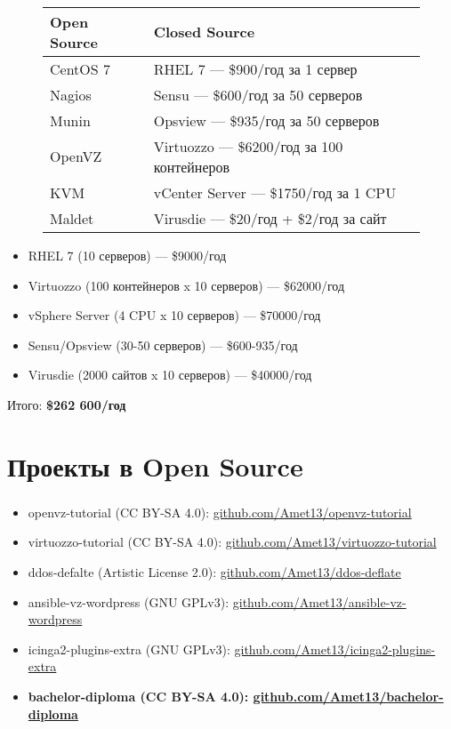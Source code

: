 \begin{frame}
\frametitle{\insertsection}
\begin{figure}[h]
	\begin{tabular}{|l|l|}
		\hline
		\bf{Open Source} & \bf{Closed Source} \\ \hline
		CentOS 7 & RHEL 7 --- \$900/год за 1 сервер \\ \hline
		Nagios & Sensu --- \$600/год за 50 серверов \\
		Munin & Opsview --- \$935/год за 50 серверов \\ \hline
		OpenVZ & Virtuozzo --- \$6200/год за 100 контейнеров \\
		KVM & vCenter Server --- \$1750/год за 1 CPU \\ \hline
		Maldet & Virusdie --- \$20/год + \$2/год за сайт \\ \hline
	\end{tabular}
\end{figure}
\begin{itemize}
	\item RHEL 7 (10 серверов) --- \$9000/год
	\item Virtuozzo (100 контейнеров x 10 серверов) --- \$62000/год
	\item vSphere Server (4 CPU x 10 серверов) --- \$70000/год
	\item Sensu/Opsview (30-50 серверов) --- \$600-935/год
	\item Virusdie (2000 сайтов x 10 серверов) --- \$40000/год
\end{itemize}
Итого: \bf{\$262 600/год}
\end{frame}


\section{Проекты в Open Source}

\begin{frame}
\frametitle{\insertsection}
\begin{itemize}
	\item openvz-tutorial (CC BY-SA 4.0): \href{https://github.com/Amet13/openvz-tutorial}{github.com/Amet13/openvz-tutorial}
	\item virtuozzo-tutorial (CC BY-SA 4.0): \href{https://github.com/Amet13/virtuozzo-tutorial}{github.com/Amet13/virtuozzo-tutorial}
	\item ddos-defalte (Artistic License 2.0): \href{https://github.com/Amet13/ddos-deflate}{github.com/Amet13/ddos-deflate}
	\item ansible-vz-wordpress (GNU GPLv3): \href{https://github.com/Amet13/ansible-vz-wordpress}{github.com/Amet13/ansible-vz-wordpress}
	\item icinga2-plugins-extra (GNU GPLv3): \href{https://github.com/Amet13/icinga2-plugins-extra}{github.com/Amet13/icinga2-plugins-extra}
	\item \bf{bachelor-diploma (CC BY-SA 4.0)}: \href{https://github.com/Amet13/bachelor-diploma}{github.com/Amet13/bachelor-diploma}
\end{itemize}
\end{frame}

